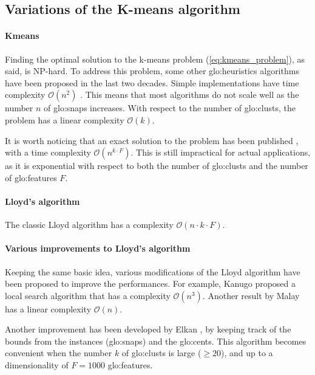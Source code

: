 \subsection{Variations of the K-means algorithm}
\label{sec:kmeans_improvements}
\paragraph*{Kmeans}
Finding the optimal solution to the k-means problem (\autoref{eq:kmeans_problem}), as said, is NP-hard.
To address this problem, some other {\gls{glo:heuristic}}s algorithms have been proposed in the last two decades. Simple implementations have time complexity $\mathcal{O}(n^2)$ \cite{Kmeans_linear}.  This means that most algorithms do not scale well as the number $n$ of {\gls{glo:snap}}s increases. With respect to the number of \gls{glo:clust}s, the problem has a linear complexity $\mathcal{O}(k)$.

It is worth noticing that an exact solution to the problem has been published \cite{Kmeans_vornoi_japan}, with a time complexity $\mathcal{O}(n^{k\cdot F})$. This is still impractical for actual applications, as it is exponential with respect to both the number of \gls{glo:clust}s and the number of \gls{glo:feature}s $F$.

\paragraph*{Lloyd's algorithm}
The classic Lloyd algorithm \cite{Lloyd1982} has a complexity $\mathcal{O}(n\cdot k\cdot F )$.

\paragraph*{Various improvements to Lloyd's algorithm} Keeping the same basic idea, various modifications of the Lloyd algorithm have been proposed to improve the performances. For example, Kanugo \cite{kanungo2004local} proposed a local search algorithm that has a complexity $\mathcal{O}(n^3)$. Another result by Malay \cite{Kmeans_linear} has a linear complexity $\mathcal{O}(n)$. 

Another improvement has been developed by Elkan \cite{kmeans-accelerated}, by keeping track of the bounds from the instances ({\gls{glo:snap}}s) and the {\gls{glo:cent}}s. This algorithm becomes convenient when the number $k$ of \gls{glo:clust}s is large ($\geq 20$), and up to a dimensionality of $F=1000$ \gls{glo:feature}s.

